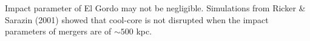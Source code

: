 Impact parameter of El Gordo may not be negligible. 
Simulations from Ricker \& Sarazin (2001) showed that cool-core is not disrupted 
when the impact parameters of mergers are of $\sim 500$ kpc.   
